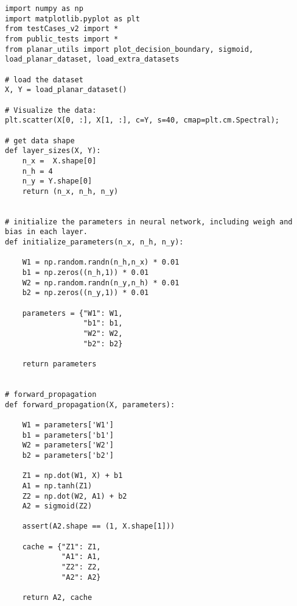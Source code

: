 \documentclass{article}
\begin{document}

\begin{lstlisting}
import numpy as np
import matplotlib.pyplot as plt
from testCases_v2 import *
from public_tests import *
from planar_utils import plot_decision_boundary, sigmoid, load_planar_dataset, load_extra_datasets

# load the dataset
X, Y = load_planar_dataset()

# Visualize the data:
plt.scatter(X[0, :], X[1, :], c=Y, s=40, cmap=plt.cm.Spectral);

# get data shape
def layer_sizes(X, Y):
    n_x =  X.shape[0]
    n_h = 4
    n_y = Y.shape[0]
    return (n_x, n_h, n_y)


# initialize the parameters in neural network, including weigh and bias in each layer.
def initialize_parameters(n_x, n_h, n_y):

    W1 = np.random.randn(n_h,n_x) * 0.01
    b1 = np.zeros((n_h,1)) * 0.01
    W2 = np.random.randn(n_y,n_h) * 0.01
    b2 = np.zeros((n_y,1)) * 0.01

    parameters = {"W1": W1,
                  "b1": b1,
                  "W2": W2,
                  "b2": b2}

    return parameters


# forward_propagation
def forward_propagation(X, parameters):

    W1 = parameters['W1']
    b1 = parameters['b1']
    W2 = parameters['W2']
    b2 = parameters['b2']

    Z1 = np.dot(W1, X) + b1
    A1 = np.tanh(Z1)
    Z2 = np.dot(W2, A1) + b2
    A2 = sigmoid(Z2)

    assert(A2.shape == (1, X.shape[1]))

    cache = {"Z1": Z1,
             "A1": A1,
             "Z2": Z2,
             "A2": A2}

    return A2, cache


\end{lstlisting}
\end{document}
